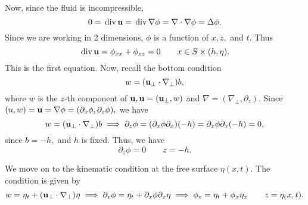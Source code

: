 \documentclass[10pt,reqno,oneside,a4paper]{article}
\begin{document}
Now, since the fluid is incompressible, 
\[ 
0 = \,\mathrm{div}\, {\bf u} = \,\mathrm{div}\, \nabla \phi = \nabla \cdot \nabla \phi = \Delta \phi. 
\]
Since we are working in 2 dimensions, $\phi$ is a function of $x,z,$ and $t.$ Thus
\begin{equation}\label{EE-main}
\,\mathrm{div}\, {\bf u} = \phi_{xx} + \phi_{zz} = 0 \qquad x\in S\times (h, \eta).
\end{equation}
This is the first equation. Now, recall the bottom condition
\[ 
w = ({\bf u}_{\perp} \cdot \nabla_{\perp})b,
\]
where $w$ is the $z$-th component of ${\bf u}, {\bf u} = ({\bf u}_{\perp}, w)$ and $\nabla = (\nabla_{\perp}, \partial_z).$ Since $(u,w) = {\bf u} = \nabla \phi = (\partial_x \phi, \partial_z \phi),$ we have
\[ 
w = ({\bf u}_{\perp} \cdot \nabla_{\perp})b \implies \partial_z \phi = (\partial_x \phi  \partial_x)(-h) = \partial_x \phi \partial_x (-h) = 0,
\]
since $b = -h,$ and $h$ is fixed. Thus, we have 
\begin{equation}\label{EE-bottom}
\partial_z \phi = 0 \qquad z = -h.
\end{equation}

We move on to the kinematic condition at the free surface $\eta(x,t).$ The condition is given by 
\begin{equation}\label{EE-kinematic}
w = \eta_t + ({\bf u}_{\perp} \cdot \nabla_{\perp})\eta \implies \partial_z \phi = \eta_t + \partial_x \phi \partial_x \eta \implies \phi_z = \eta_t + \phi_x \eta_x \qquad z = \eta_(x,t).
\end{equation}
\end{document}
